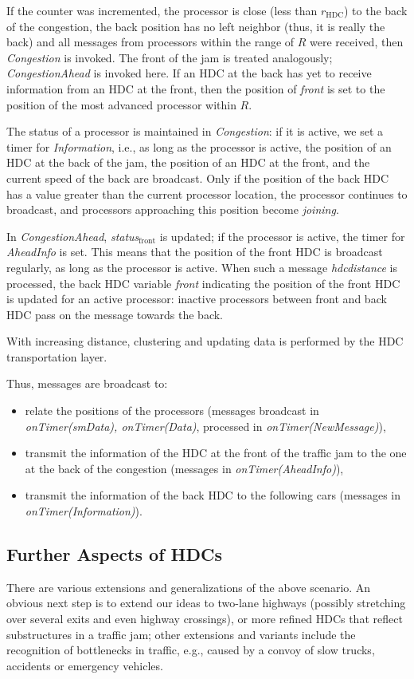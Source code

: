 \documentclass{acmrip}
\begin{document}
If the counter was incremented, the processor is close (less than
$r_\mathrm{HDC}$) to the back of the congestion, the back position
has no left neighbor (thus,
it is really the back) and all messages from processors within the
range of $R$ were received, then {\em Congestion} is invoked. The
front of the jam is treated analogously; {\em CongestionAhead} is
invoked here. If an HDC at the back has yet to receive information
from an HDC at the front, then the position of {\em front} is set
to the position of the most advanced processor within $R$.

The status of a processor is maintained in {\em Congestion}: if it
is active, we set a timer for {\em Information}, i.e., as long as
the processor is active, the position of an HDC at the back of the
jam, the position of an HDC at the front, and the current speed of
the back are broadcast. Only if the position of the back HDC has a
value greater than the current processor location, the processor
continues to broadcast, and processors approaching this position
become {\em joining}.

In {\em CongestionAhead}, {\em status}$_\mathrm{front}$ is updated;
if the processor is active, the timer for {\em AheadInfo} is set.
This means that the position of the front HDC is broadcast
regularly, as long as the processor is active. When such a message
{\em hdcdistance} is processed, the back HDC variable {\em front}
indicating the position of the front HDC is updated for an active
processor: inactive processors between front and back HDC pass on
the message towards the back.


With increasing distance, clustering and updating data is performed
by the HDC transportation layer.

Thus, messages are broadcast to:
\begin{itemize}
\item relate the positions of the processors (messages broadcast in
{\em onTimer(smData), onTimer(Data)}, processed in {\em onTimer(NewMessage)}),
\item transmit the information of the HDC at the front of the
traffic jam to the one at the back of the congestion (messages in
{\em onTimer(AheadInfo)}),
\item transmit the information of the back HDC to the following cars
(messages in {\em onTimer(Information)}).
\end{itemize}

\subsection{Further Aspects of HDCs}
There are various extensions and generalizations of the above
scenario. An obvious next step is to extend our ideas to two-lane
highways (possibly stretching over several exits and even highway
crossings), or more refined HDCs that reflect substructures in a
traffic jam; other extensions and variants include the recognition
of bottlenecks in traffic, e.g., caused by a convoy of slow trucks,
accidents or emergency vehicles.
\end{document}
